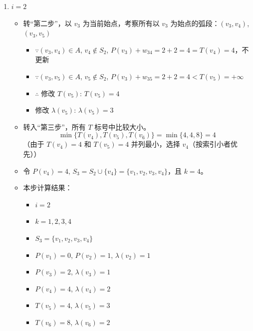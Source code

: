 \begin{enumerate}[label=(\arabic*)]
    \item \( i = 2 \)
    \begin{itemize}
        \item 转“第二步”，以 \( v_3 \) 为当前始点，考察所有以 \( v_3 \) 为始点的弧段：\( (v_3, v_4) \), \( (v_3, v_5) \)
        \begin{itemize}
            \item \(\because (v_3, v_4) \in A\), \( v_4 \notin S_2 \), \( P(v_3) + w_{34} = 2 + 2 = 4 = T(v_4) = 4 \)，不更新
            \item \(\because (v_3, v_5) \in A\), \( v_5 \notin S_2 \), \( P(v_3) + w_{35} = 2 + 2 = 4 < T(v_5) = +\infty \)
            \item \(\therefore\) 修改 \( T(v_5) \): \( T(v_5) = 4 \)
            \item 修改 \( \lambda(v_5) \): \( \lambda(v_5) = 3 \)
        \end{itemize}
        \item 转入“第三步”，所有 \( T \) 标号中比较大小。
        \[
        \min\{T(v_4), T(v_5), T(v_6)\} = \min\{4, 4, 8\} = 4
        \]
        （由于 \( T(v_4) = 4 \) 和 \( T(v_5) = 4 \) 并列最小，选择 \( v_4 \)（按索引小者优先））
        \item 令 \( P(v_4) = 4 \), \( S_3 = S_2 \cup \{v_4\} = \{v_1, v_2, v_3, v_4\} \)，且 \( k = 4 \)。
        \item 本步计算结果：
        \begin{itemize}
            \item \( i = 2 \)
            \item \( k = 1, 2, 3, 4 \)
            \item \( S_3 = \{v_1, v_2, v_3, v_4\} \)
            \item \( P(v_1) = 0 \), \( P(v_2) = 1 \), \( \lambda(v_2) = 1 \)
            \item \( P(v_3) = 2 \), \( \lambda(v_3) = 1 \)
            \item \( P(v_4) = 4 \), \( \lambda(v_4) = 2 \)
            \item \( T(v_5) = 4 \), \( \lambda(v_5) = 3 \)
            \item \( T(v_6) = 8 \), \( \lambda(v_6) = 2 \)
        \end{itemize}
    \end{itemize}


\end{enumerate}
